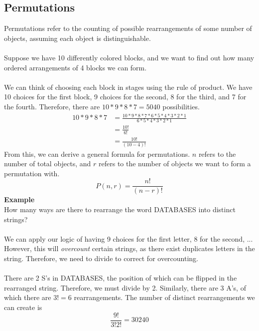 \documentclass[12pt]{article}
\begin{document}
	\subsection{Permutations}
	Permutations refer to the counting of possible rearrangements of some number of objects, assuming each object is distinguishable. \\\\
	Suppose we have 10 differently colored blocks, and we want to find out how many ordered arrangements of 4 blocks we can form.\\\\
	We can think of choosing each block in stages using the rule of product. We have 10 choices for the first block, 9 choices for the second, 8 for the third, and 7 for the fourth. Therefore, there are $10 * 9 * 8 * 7 = 5040$ possibilities.
	\begin{align*}
		10 * 9 * 8 * 7 &= \frac{10 * 9 * 8 * 7 * 6 * 5 * 4 * 3 * 2 * 1}{6 * 5 * 4 * 3 * 2 * 1} \\
		&= \frac{10!}{6!} \\
		&= \frac{10!}{(10 - 4)!}
	\end{align*}
	From this, we can derive a general formula for permutations. $n$ refers to the number of total objects, and $r$ refers to the number of objects we want to form a permutation with.
	$$P(n, r) = \frac{n!}{(n - r)!}$$
	\textbf{Example}\\
	How many ways are there to rearrange the word DATABASES into distinct strings? \\\\
	We can apply our logic of having 9 choices for the first letter, 8 for the second, ... However, this will \textit{overcount} certain strings, as there exist duplicates letters in the string. Therefore, we need to divide to correct for overcounting. \\\\
	There are 2 S's in DATABASES, the position of which can be flipped in the rearranged string. Therefore, we must divide by 2. Similarly, there are 3 A's, of which there are $3! = 6$ rearrangements. The number of distinct rearrangements we can create is
	$$\frac{9!}{3!2!} = 30240$$
\end{document}
